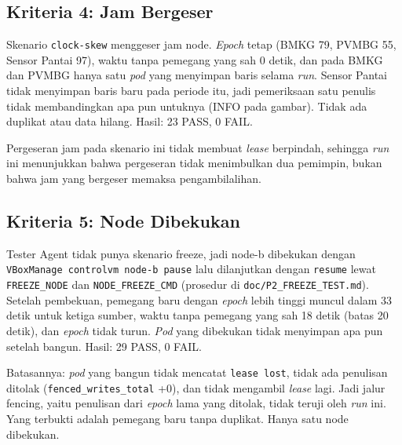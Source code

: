
\subsection{Kriteria 4: Jam Bergeser}

Skenario \texttt{clock-skew} menggeser jam node. \textit{Epoch} tetap (BMKG 79, PVMBG 55, Sensor Pantai 97), waktu tanpa pemegang yang sah 0 detik, dan pada BMKG dan PVMBG hanya satu \textit{pod} yang menyimpan baris selama \textit{run}. Sensor Pantai tidak menyimpan baris baru pada periode itu, jadi pemeriksaan satu penulis tidak membandingkan apa pun untuknya (INFO pada gambar). Tidak ada duplikat atau data hilang. Hasil: 23 PASS, 0 FAIL.

Pergeseran jam pada skenario ini tidak membuat \textit{lease} berpindah, sehingga \textit{run} ini menunjukkan bahwa pergeseran tidak menimbulkan dua pemimpin, bukan bahwa jam yang bergeser memaksa pengambilalihan.


\subsection{Kriteria 5: Node Dibekukan}

Tester Agent tidak punya skenario freeze, jadi node-b dibekukan dengan \texttt{VBoxManage controlvm node-b pause} lalu dilanjutkan dengan \texttt{resume} lewat \texttt{FREEZE\_NODE} dan \texttt{NODE\_FREEZE\_CMD} (prosedur di \texttt{doc/P2\_FREEZE\_TEST.md}). Setelah pembekuan, pemegang baru dengan \textit{epoch} lebih tinggi muncul dalam 33 detik untuk ketiga sumber, waktu tanpa pemegang yang sah 18 detik (batas 20 detik), dan \textit{epoch} tidak turun. \textit{Pod} yang dibekukan tidak menyimpan apa pun setelah bangun. Hasil: 29 PASS, 0 FAIL.

Batasannya: \textit{pod} yang bangun tidak mencatat \texttt{lease lost}, tidak ada penulisan ditolak (\texttt{fenced\_writes\_total} +0), dan tidak mengambil \textit{lease} lagi. Jadi jalur fencing, yaitu penulisan dari \textit{epoch} lama yang ditolak, tidak teruji oleh \textit{run} ini. Yang terbukti adalah pemegang baru tanpa duplikat. Hanya satu node dibekukan.

